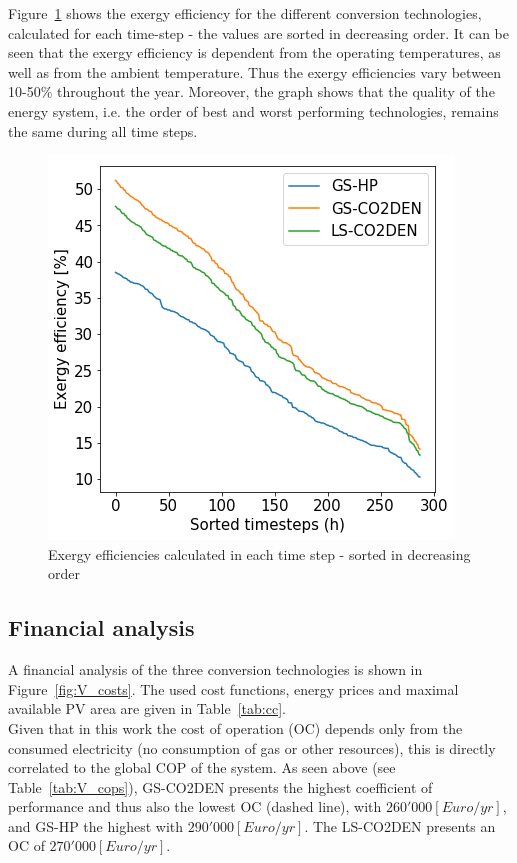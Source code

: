 \documentclass{article}
\begin{document}


Figure~\ref{fig:v_exe} shows the exergy efficiency for the different conversion technologies, calculated for each time-step - the values are sorted in decreasing order. It can be seen that the exergy efficiency is dependent from the operating temperatures, as well as from the ambient temperature. Thus the exergy efficiencies vary between 10-50\% throughout the year. Moreover, the graph shows that the quality of the energy system, i.e. the order of best and worst performing technologies, remains the same during all time steps.

\begin{figure}[tph]
	\centering
	\includegraphics[width=0.45\linewidth]{exe}
	\caption{Exergy efficiencies calculated in each time step - sorted in decreasing order}
	\label{fig:v_exe}
\end{figure}

\subsection{Financial analysis}
A financial analysis of the three conversion technologies is shown in Figure~\ref{fig:V_costs}. 
The used cost functions, energy prices and maximal available PV area are given in Table~\ref{tab:cc}. \\



Given that in this work the cost of operation (OC) depends only from the consumed electricity (no consumption of gas or other resources), this is directly correlated to the global COP of the system. As seen above (see Table~\ref{tab:V_cops}), GS-CO2DEN presents the highest coefficient of performance and thus also the lowest OC (dashed line), with $260'000[Euro/yr]$, and GS-HP the highest with $290'000[Euro/yr]$. The LS-CO2DEN presents an OC of $270'000[Euro/yr]$.\\
\end{document}
